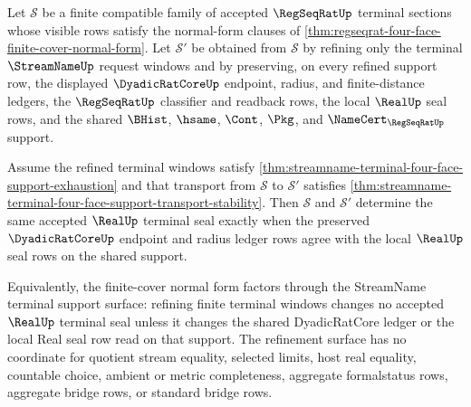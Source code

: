\begin{theorem}
\label{thm:regseqrat-finite-cover-normal-form-streamname-support-refinement}
Let $\mathcal{S}$ be a finite compatible family of accepted
$\RegSeqRatUp$ terminal sections whose visible rows satisfy the normal-form
clauses of
\autoref{thm:regseqrat-four-face-finite-cover-normal-form}. Let
$\mathcal{S}'$ be obtained from $\mathcal{S}$ by refining only the terminal
$\StreamNameUp$ request windows and by preserving, on every refined support
row, the displayed $\DyadicRatCoreUp$ endpoint, radius, and finite-distance
ledgers, the $\RegSeqRatUp$ classifier and readback rows, the local
$\RealUp$ seal rows, and the shared $\BHist$, $\hsame$, $\Cont$, $\Pkg$, and
$\NameCert_{\RegSeqRatUp}$ support.

Assume the refined terminal windows satisfy
\autoref{thm:streamname-terminal-four-face-support-exhaustion} and that
transport from $\mathcal{S}$ to $\mathcal{S}'$ satisfies
\autoref{thm:streamname-terminal-four-face-support-transport-stability}. Then
$\mathcal{S}$ and $\mathcal{S}'$ determine the same accepted $\RealUp$
terminal seal exactly when the preserved $\DyadicRatCoreUp$ endpoint and
radius ledger rows agree with the local $\RealUp$ seal rows on the shared
support.

Equivalently, the finite-cover normal form factors through the StreamName
terminal support surface: refining finite terminal windows changes no
accepted $\RealUp$ terminal seal unless it changes the shared DyadicRatCore
ledger or the local Real seal row read on that support. The refinement surface
has no coordinate for quotient stream equality, selected limits, host real
equality, countable choice, ambient or metric completeness, aggregate
formalstatus rows, aggregate bridge rows, or standard bridge rows.
\end{theorem}
